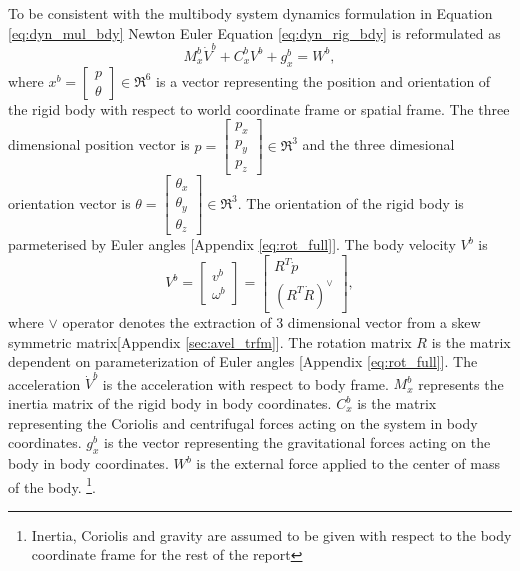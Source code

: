 To be consistent with the multibody system dynamics formulation in Equation \ref{eq:dyn_mul_bdy} Newton Euler Equation \ref{eq:dyn_rig_bdy} is reformulated as
\begin{equation}
\label{eq:dyn_rig_bdy_sh}
M_x^b \dot V^b + C_x^b V^b+g_x^b = W^b,
\end{equation}
 where $x^b=\begin{bmatrix}p \\ \theta\end{bmatrix} \in \Re^6$ is a vector representing the position and orientation of the rigid body with respect to world coordinate frame or spatial frame. The three dimensional position vector is $p=\begin{bmatrix}p_x \\ p_y \\ p_z \end{bmatrix} \in \Re^3$ and the three dimesional orientation vector is $ \theta= \begin{bmatrix} \theta_{x} \\ \theta_{y} \\ \theta_{z} \end{bmatrix} \in \Re^3$. The orientation of the rigid body is parmeterised by Euler angles [Appendix \ref{eq:rot_full}]. 
 The body velocity $V^b$ is 
 \begin{equation}
\label{eq:body_vel}
V^b =
\begin{bmatrix}
v^b \\ \omega^b
\end{bmatrix}
= \begin{bmatrix}
R^T \dot{p} \\ (R^T \dot{R})^\vee
\end{bmatrix},
\end{equation}
where $\vee$ operator denotes the extraction of 3 dimensional vector from a skew symmetric matrix[Appendix \ref{sec:avel_trfm}]. The rotation matrix $R$ is the matrix dependent on parameterization of Euler angles [Appendix \ref{eq:rot_full}]. The acceleration $\dot{V}^b$ is the acceleration with respect to body frame. $M_x^b$ represents the inertia matrix of the rigid body in body coordinates. $C_x^b$ is the matrix representing the Coriolis and centrifugal forces acting on the system in body coordinates. $g_x^b$ is the vector representing the gravitational forces acting on the body in body coordinates. $W^b$ is the external force applied to the center of mass of the body. \footnote[2]{Inertia, Coriolis and gravity are assumed to be given with respect to the body coordinate frame for the rest of the report}.

